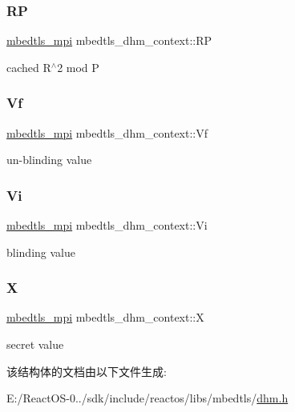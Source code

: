 \subsubsection{\texorpdfstring{RP}{RP}}
{\footnotesize\ttfamily \hyperlink{structmbedtls__mpi}{mbedtls\+\_\+mpi} mbedtls\+\_\+dhm\+\_\+context\+::\+RP}

cached R$^\wedge$2 mod P \mbox{\label{structmbedtls__dhm__context_a1ebf1105240ca26820edb81f41dd6180}} 
\subsubsection{\texorpdfstring{Vf}{Vf}}
{\footnotesize\ttfamily \hyperlink{structmbedtls__mpi}{mbedtls\+\_\+mpi} mbedtls\+\_\+dhm\+\_\+context\+::\+Vf}

un-\/blinding value \mbox{\label{structmbedtls__dhm__context_a21fea3aadf6f05d8aa42c79e55c5d98c}} 
\subsubsection{\texorpdfstring{Vi}{Vi}}
{\footnotesize\ttfamily \hyperlink{structmbedtls__mpi}{mbedtls\+\_\+mpi} mbedtls\+\_\+dhm\+\_\+context\+::\+Vi}

blinding value \mbox{\label{structmbedtls__dhm__context_a175e534f5a3a4483ebcc4d7ec852d4cd}} 
\subsubsection{\texorpdfstring{X}{X}}
{\footnotesize\ttfamily \hyperlink{structmbedtls__mpi}{mbedtls\+\_\+mpi} mbedtls\+\_\+dhm\+\_\+context\+::X}

secret value 

该结构体的文档由以下文件生成\+:\begin{DoxyCompactItemize}
\item 
E\+:/\+React\+O\+S-\/0../sdk/include/reactos/libs/mbedtls/\hyperlink{dhm_8h}{dhm.\+h}\end{DoxyCompactItemize}
